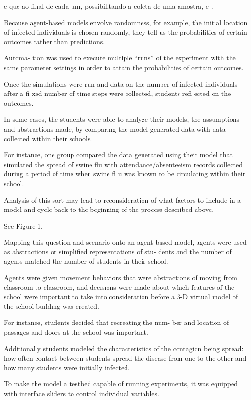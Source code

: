 e que ao final de cada um, possibilitando a coleta de uma amostra, e .



Because agent-based models envolve randomness, for example, the initial location of infected individuals is chosen randomly, they tell us the probabilities of certain outcomes rather than predictions.

Automa- tion was used to execute multiple “runs” of the experiment with the same parameter settings in order to attain the probabilities of certain outcomes.

Once the simulations were run and data on the number of infected individuals after a fi xed number of time steps were collected, students refl ected on the outcomes.

In some cases, the students were able to analyze their models, the assumptions and abstractions made, by comparing the model generated data with data collected within their schools.

For instance, one group compared the data generated using their model that simulated the spread of swine flu with attendance/absenteeism records collected during a period of time when swine fl u was known to be circulating within their school.

Analysis of this sort may lead to reconsideration of what factors to include in a model and cycle back to the beginning of the process described above.

See Figure 1.

Mapping this question and scenario onto an agent based model, agents were used as abstractions or simplified representations of stu- dents and the number of agents matched the number of students in their school.

Agents were given movement behaviors that were abstractions of moving from classroom to classroom, and decisions were made about which features of the school were important to take into consideration before a 3-D virtual model of the school building was created.

For instance, students decided that recreating the num- ber and location of passages and doors at the school was important.

Additionally students modeled the characteristics of the contagion being spread: how often contact between students spread the disease from one to the other and how many students were initially infected.

To make the model a testbed capable of running experiments, it was equipped with interface sliders to control individual variables.

